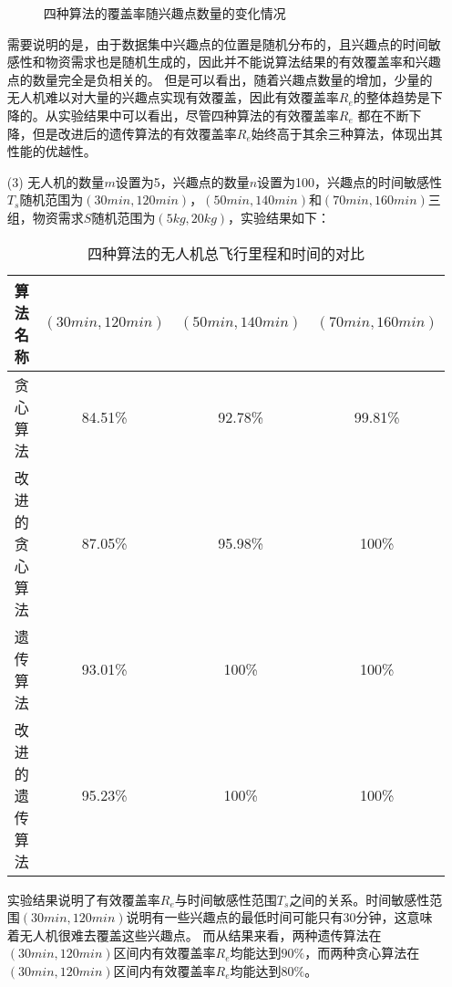 \begin{itemize}
\begin{figure}[H]
\begin{center}
        \end{center}
        \caption{四种算法的覆盖率随兴趣点数量的变化情况}
        \label{fig502}
    \end{figure}
    需要说明的是，由于数据集中兴趣点的位置是随机分布的，且兴趣点的时间敏感性和物资需求也是随机生成的，因此并不能说算法结果的有效覆盖率和兴趣点的数量完全是负相关的。
    但是可以看出，随着兴趣点数量的增加，少量的无人机难以对大量的兴趣点实现有效覆盖，因此有效覆盖率$R_e$的整体趋势是下降的。从实验结果中可以看出，尽管四种算法的有效覆盖率$R_e$
    都在不断下降，但是改进后的遗传算法的有效覆盖率$R_e$始终高于其余三种算法，体现出其性能的优越性。
    \item [(3)]无人机的数量$m$设置为5，兴趣点的数量$n$设置为100，兴趣点的时间敏感性$T_s$随机范围为$(30min,120min)$，$(50min,140min)$和$(70min,160min)$三组，物资需求$S$随机范围为$(5kg,20kg)$，实验结果如下：
    \begin{table}[H]
        \begin{center}
            \begin{tabular}{|c|c|c|c|}
                \hline
                算法名称 & $(30min,120min)$ & $(50min,140min)$ & $(70min,160min)$ \\
                \hline
                贪心算法 & 84.51\% & 92.78\% & 99.81\%\\
                \hline
                改进的贪心算法 & 87.05\% & 95.98\% & 100\%\\
                \hline
                遗传算法 & 93.01\% & 100\% & 100\% \\
                \hline
                改进的遗传算法 & 95.23\% & 100\% & 100\% \\
                \hline
            \end{tabular}
            \caption{四种算法的无人机总飞行里程和时间的对比}
        \end{center}
    \end{table}
    实验结果说明了有效覆盖率$R_e$与时间敏感性范围$T_s$之间的关系。时间敏感性范围$(30min,120min)$说明有一些兴趣点的最低时间可能只有30分钟，这意味着无人机很难去覆盖这些兴趣点。
    而从结果来看，两种遗传算法在$(30min,120min)$区间内有效覆盖率$R_e$均能达到$90\%$，而两种贪心算法在$(30min,120min)$区间内有效覆盖率$R_e$均能达到$80\%$。
\end{itemize}


